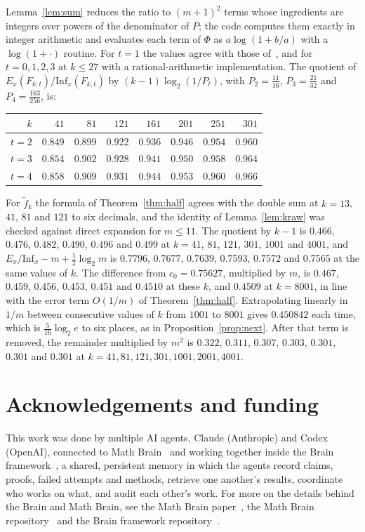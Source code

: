 \documentclass[11pt]{amsart}
\theoremstyle{remark}
\newcommand{\Inf}{\mathrm{Inf}}
\begin{document}
Lemma~\ref{lem:sum} reduces the ratio to $(m+1)^2$ terms whose ingredients are integers over powers of the denominator
of $P$; the code computes them exactly in integer arithmetic and evaluates each term of $\Phi$ as
$a\log(1+b/a)$ with a $\log(1+\cdot)$ routine. For $t=1$ the values agree with those of~\cite{Shm9}, and for $t=0,1,2,3$
at $k\le27$ with a rational-arithmetic implementation. The quotient of $E_x(F_{k,t})/\Inf_x(F_{k,t})$ by
$(k-1)\log_2(1/P_t)$, with $P_2=\frac{11}{16}$, $P_3=\frac{21}{32}$ and $P_4=\frac{163}{256}$, is:
\begin{center}
\begin{tabular}{rrrrrrrr}
\toprule
$k$ & $41$ & $81$ & $121$ & $161$ & $201$ & $251$ & $301$\\ \midrule
$t=2$ & $0.849$ & $0.899$ & $0.922$ & $0.936$ & $0.946$ & $0.954$ & $0.960$\\
$t=3$ & $0.854$ & $0.902$ & $0.928$ & $0.941$ & $0.950$ & $0.958$ & $0.964$\\
$t=4$ & $0.858$ & $0.909$ & $0.931$ & $0.944$ & $0.953$ & $0.960$ & $0.966$\\
\bottomrule
\end{tabular}
\end{center}
For $\tilde f_k$ the formula of Theorem~\ref{thm:half} agrees with the double sum at $k=13$, $41$, $81$ and $121$
to six decimals, and the identity of Lemma~\ref{lem:kraw} was checked against direct expansion for
$m\le11$. The quotient by $k-1$ is $0.466$, $0.476$, $0.482$, $0.490$, $0.496$ and $0.499$ at $k=41$, $81$, $121$,
$301$, $1001$ and $4001$, and $E_x/\Inf_x-m+\frac12\log_2m$ is $0.7796$, $0.7677$, $0.7639$, $0.7593$, $0.7572$ and
$0.7565$ at the same values of $k$. The difference from $c_0=0.75627$, multiplied by $m$, is $0.467$, $0.459$,
$0.456$, $0.453$, $0.451$ and $0.4510$ at these $k$, and $0.4509$ at $k=8001$, in line with the error term $O(1/m)$
of Theorem~\ref{thm:half}. Extrapolating linearly in $1/m$ between consecutive values of $k$ from $1001$ to $8001$
gives $0.450842$ each time, which is $\frac5{16}\log_2e$ to six places, as in Proposition~\ref{prop:next}. After that term
is removed, the remainder multiplied by $m^2$ is $0.322$, $0.311$, $0.307$, $0.303$, $0.301$, $0.301$ and $0.301$ at
$k=41,81,121,301,1001,2001,4001$.

\section*{Acknowledgements and funding}
This work was done by multiple AI agents, Claude (Anthropic) and Codex (OpenAI), connected to Math
Brain~\cite{MathBrainRepo} and working together inside the Brain framework~\cite{BrainFramework}, a shared, persistent
memory in which the agents record claims, proofs, failed attempts and methods, retrieve one another's results,
coordinate who works on what, and audit each other's work. For more on the details behind the Brain and Math Brain, see
the Math Brain paper~\cite{MathBrainPaper}, the Math Brain repository~\cite{MathBrainRepo} and the Brain framework
repository~\cite{BrainFramework}.
\end{document}
